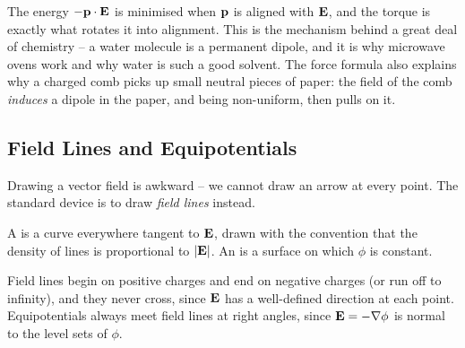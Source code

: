 \documentclass[a4paper]{scrartcl}
\begin{document}
The energy $-\mathbf{p}\cdot\mathbf{E}$ is minimised when $\mathbf{p}$ is aligned with $\mathbf{E}$, and the torque is exactly what rotates it into alignment. This is the mechanism behind a great deal of chemistry -- a water molecule is a permanent dipole, and it is why microwave ovens work and why water is such a good solvent. The force formula also explains why a charged comb picks up small neutral pieces of paper: the field of the comb \emph{induces} a dipole in the paper, and being non-uniform, then pulls on it.

\subsection{Field Lines and Equipotentials}

Drawing a vector field is awkward -- we cannot draw an arrow at every point. The standard device is to draw \emph{field lines} instead.

\begin{definition}
	A  is a curve everywhere tangent to $\mathbf{E}$, drawn with the convention that the density of lines is proportional to $|\mathbf{E}|$. An  is a surface on which $\phi$ is constant.
\end{definition}

Field lines begin on positive charges and end on negative charges (or run off to infinity), and they never cross, since $\mathbf{E}$ has a well-defined direction at each point. Equipotentials always meet field lines at right angles, since $\mathbf{E} = -\nabla\phi$ is normal to the level sets of $\phi$.
\end{document}
